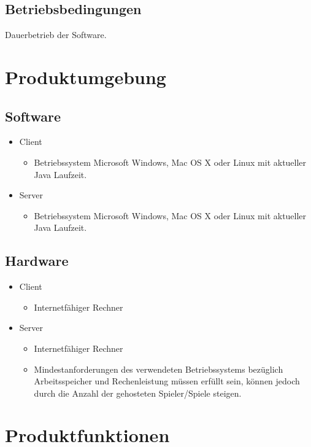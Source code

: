 \documentclass{article}
\begin{document}
\subsection{Betriebsbedingungen}
Dauerbetrieb der Software.

\section{Produktumgebung}
\subsection{Software}
	\begin{itemize}
		\item \gls{Client}
		\begin{itemize}
			\item Betriebssystem Microsoft Windows, Mac OS X oder Linux mit aktueller Java Laufzeit.
		\end{itemize}
		\item \gls{Server}
		\begin{itemize}
			\item Betriebssystem Microsoft Windows, Mac OS X oder Linux mit aktueller Java Laufzeit.
		\end{itemize}
	\end{itemize}

\subsection{Hardware}
\begin{itemize}
		\item \gls{Client}
		\begin{itemize}
			\item Internetfähiger Rechner
		\end{itemize}
		\item Server
		\begin{itemize}
			\item Internetfähiger Rechner	
			\item Mindestanforderungen des verwendeten Betriebssystems bezüglich Arbeitsspeicher und Rechenleistung 					      müssen erfüllt sein, können jedoch durch die Anzahl der gehosteten Spieler/Spiele steigen.
		\end{itemize}
	\end{itemize}

\section{Produktfunktionen}
\end{document}
